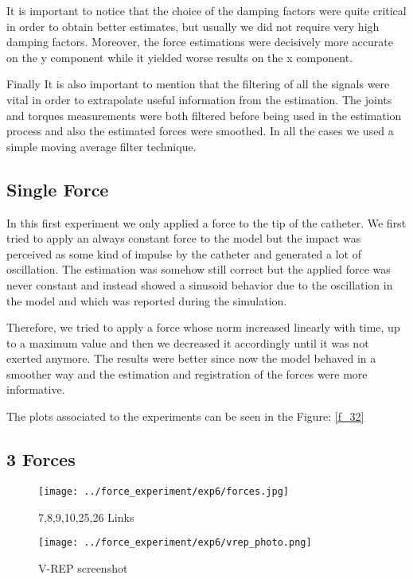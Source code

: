 \documentclass[conference,12pt]{IEEEtran}
\begin{document}
It is important to notice that the choice of the damping factors were quite critical in order to obtain better estimates, but usually we did not require very high damping factors. Moreover, the force estimations were decisively more accurate on the y component while it yielded worse results on the x component.

Finally It is also important to mention that the filtering of all the signals were vital in order to extrapolate useful information from the estimation. The joints and torques measurements were both filtered before being used in the estimation process and also the estimated forces were smoothed. In all the cases we used a simple moving average filter technique.

\subsection{Single Force}

In this first experiment we only applied a force to the tip of the catheter. We first tried to apply an always constant force to the model but the impact was perceived as some kind of impulse by the catheter and generated a lot of oscillation. The estimation was somehow still correct but the applied force was never constant and instead showed a sinusoid behavior due to the oscillation in the model and which was reported during the simulation.

Therefore, we tried to apply a force whose norm increased linearly with time, up to a maximum value and then we decreased it accordingly until it was not exerted anymore. The results were better since now the model behaved in a smoother way and the estimation and registration of the forces were more informative.

The plots associated to the experiments can be seen in the Figure: \ref{f_32}

\subsection{3 Forces}

\begin{figure*}[t]
	\begin{minipage}{\columnwidth}
		\centering
		\texttt{[image: ../force\_experiment/exp6/forces.jpg]}
		\caption{7,8,9,10,25,26 Links}
		\label{f_6_link}
	\end{minipage}%
	\begin{minipage}{\columnwidth}
		\centering
		\texttt{[image: ../force\_experiment/exp6/vrep\_photo.png]}
		\caption{V-REP screenshot}
		\label{vrep_photo}
	\end{minipage}
\end{figure*}
\end{document}
